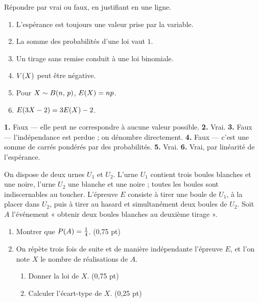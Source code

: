 \begin{jemeteste}
Répondre par vrai ou faux, en justifiant en une ligne.

\begin{enumerate}[label=\textbf{\arabic*.}, leftmargin=*, itemsep=0.28em]
  \item L'espérance est toujours une valeur prise par la variable.
  \item La somme des probabilités d'une loi vaut $1$.
  \item Un tirage sans remise conduit à une loi binomiale.
  \item $V(X)$ peut être négative.
  \item Pour $X \sim B(n,\,p)$, $E(X) = np$.
  \item $E(3X-2) = 3E(X)-2$.
\end{enumerate}
\end{jemeteste}

\begin{corrige}[je me teste]
\textbf{1.} Faux — elle peut ne correspondre à aucune valeur possible.
\textbf{2.} Vrai.
\textbf{3.} Faux — l'indépendance est perdue ; on dénombre directement.
\textbf{4.} Faux — c'est une somme de carrés pondérés par des probabilités.
\textbf{5.} Vrai.
\textbf{6.} Vrai, par linéarité de l'espérance.
\end{corrige}

\begin{commeaubac}
On dispose de deux urnes $U_{1}$ et $U_{2}$. L'urne $U_{1}$ contient trois
boules blanches et une noire, l'urne $U_{2}$ une blanche et une noire ; toutes
les boules sont indiscernables au toucher. L'épreuve $E$ consiste à tirer une
boule de $U_{1}$, à la placer dans $U_{2}$, puis à tirer au hasard et
simultanément deux boules de $U_{2}$. Soit $A$ l'événement « obtenir deux
boules blanches au deuxième tirage ».

\begin{enumerate}[label=\textbf{\arabic*.}, leftmargin=*, itemsep=0.25em]
  \item Montrer que $P\!\left(A\right) = \frac14$. \hfill\textup{(0,75 pt)}
  \item On répète trois fois de suite et de manière indépendante l'épreuve
        $E$, et l'on note $X$ le nombre de réalisations de $A$.
        \begin{enumerate}[label=\textbf{\alph*)}, leftmargin=1.4em]
          \item Donner la loi de $X$. \hfill\textup{(0,75 pt)}
          \item Calculer l'écart-type de $X$. \hfill\textup{(0,25 pt)}
        \end{enumerate}
\end{enumerate}
\end{commeaubac}

